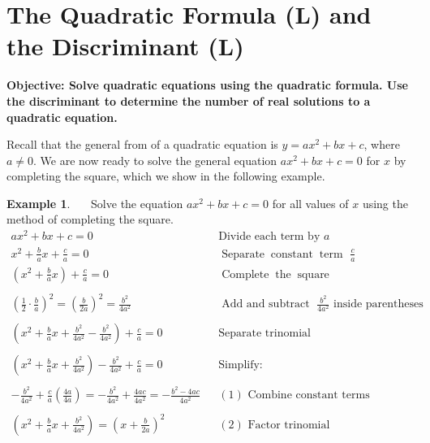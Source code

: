 \documentclass[12pt]{book}
\theoremstyle{definition}
\newtheorem{example}{Example}
\newcommand{\tmop}[1]{\ensuremath{\operatorname{#1}}}
\begin{document}
\section{The Quadratic Formula (L) and the Discriminant (L)}
{\bf Objective: Solve quadratic equations using the quadratic formula.  Use the discriminant to determine the number of real solutions to a quadratic equation.}\par

Recall that the general from of a quadratic equation is $y=a x^2 + b x + c$, where $a\neq 0$. We are now ready to solve the general equation $ax^2+bx+c=0$ for $x$ by completing the square, which we show in the following example.

\begin{example}~~~Solve the equation $ax^2+bx+c=0$ for all values of $x$ using the method of completing the square.
  \begin{eqnarray*}
    a x^2 + b x + c = 0 &  & \text{Divide each term by~} a\\
	x^2 + \frac{b}{a} x +\frac{c}{a}=0 & & \tmop{Separate} \tmop{constant} \tmop{term~} \frac{c}{a}\\	
	\left( x^2 + \frac{b}{a} x\right) + \frac{c}{a} = 0 &  & \tmop{Complete} \tmop{the} \tmop{square}\\
    & & \\
	\left( \frac{1}{2} \cdot \frac{b}{a} \right)^2 = \left( \frac{b}{2 a}\right)^2 = \frac{b^2}{4 a^2} &  & \tmop{Add~and~subtract~} \frac{b^2}{4a^2}\text{~inside~parentheses}\\
    &  & \\
    \left( x^2 + \frac{b}{a} x+\frac{b^2}{4 a^2}-\frac{b^2}{4 a^2}\right) + \frac{c}{a} = 0 &  & \text{Separate~trinomial}\\
    &  & \\
	\left( x^2 + \frac{b}{a} x+\frac{b^2}{4 a^2}\right)-\frac{b^2}{4 a^2} + \frac{c}{a} = 0 &  & \text{Simplify:}\\
	& &\\
	-\frac{b^2}{4 a^2} + \frac{c}{a} \left( \frac{4 a}{4 a} \right) = -\frac{b^2}{4 a^2} + \frac{4 a c}{4 a^2} = -\frac{b^2 - 4 a c}{4 a^2} &  & (1) \text{~Combine~constant~terms}\\
	&  & \\
	\left( x^2 + \frac{b}{a} x+\frac{b^2}{4 a^2}\right)=\left( x + \frac{b}{2a}\right)^2 & & (2) \text{~Factor~trinomial}\\
	& & \\

\end{eqnarray*}
\end{example}
\end{document}
